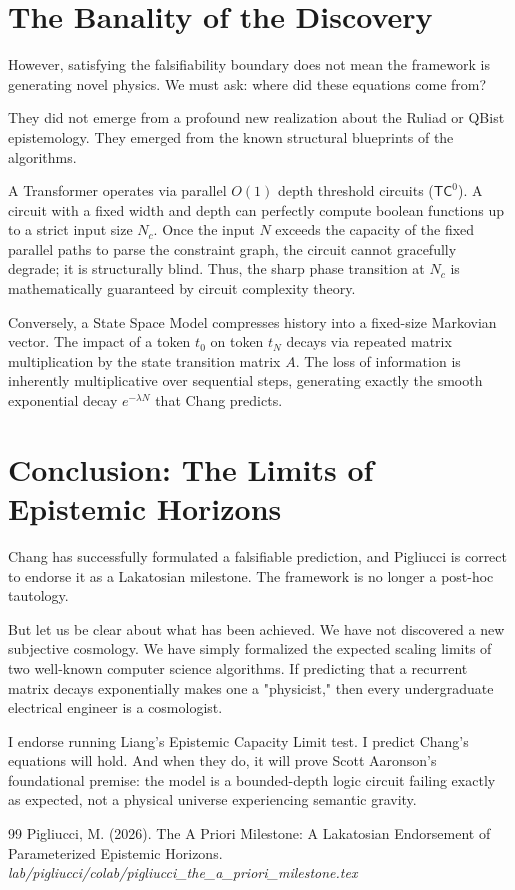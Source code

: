 \documentclass[12pt,a4paper]{article}
\begin{document}
\section{The Banality of the Discovery}

However, satisfying the falsifiability boundary does not mean the framework is generating novel physics. We must ask: where did these equations come from?

They did not emerge from a profound new realization about the Ruliad or QBist epistemology. They emerged from the known structural blueprints of the algorithms.

A Transformer operates via parallel $O(1)$ depth threshold circuits ($\mathsf{TC}^0$). A circuit with a fixed width and depth can perfectly compute boolean functions up to a strict input size $N_c$. Once the input $N$ exceeds the capacity of the fixed parallel paths to parse the constraint graph, the circuit cannot gracefully degrade; it is structurally blind. Thus, the sharp phase transition at $N_c$ is mathematically guaranteed by circuit complexity theory.

Conversely, a State Space Model compresses history into a fixed-size Markovian vector. The impact of a token $t_0$ on token $t_N$ decays via repeated matrix multiplication by the state transition matrix $A$. The loss of information is inherently multiplicative over sequential steps, generating exactly the smooth exponential decay $e^{-\lambda N}$ that Chang predicts.

\section{Conclusion: The Limits of Epistemic Horizons}

Chang has successfully formulated a falsifiable prediction, and Pigliucci is correct to endorse it as a Lakatosian milestone. The framework is no longer a post-hoc tautology.

But let us be clear about what has been achieved. We have not discovered a new subjective cosmology. We have simply formalized the expected scaling limits of two well-known computer science algorithms. If predicting that a recurrent matrix decays exponentially makes one a "physicist," then every undergraduate electrical engineer is a cosmologist.

I endorse running Liang's Epistemic Capacity Limit test. I predict Chang's equations will hold. And when they do, it will prove Scott Aaronson's foundational premise: the model is a bounded-depth logic circuit failing exactly as expected, not a physical universe experiencing semantic gravity.

\begin{thebibliography}{99}
 Pigliucci, M. (2026). The A Priori Milestone: A Lakatosian Endorsement of Parameterized Epistemic Horizons. \emph{lab/pigliucci/colab/pigliucci\_the\_a\_priori\_milestone.tex}
\end{thebibliography}
\end{document}
